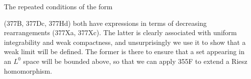 {The repeated conditions of the form



\noindent (377B, 377Dc, 377Hd) both have expressions in terms of
decreasing rearrangements (377Xa, 377Xc).   The latter is clearly
associated with uniform integrability and weak compactness, and
unsurprisingly we use it to show that a weak limit will be defined.
The former is there to ensure that a set appearing in an $L^0$ space will
be bounded above, so that we can apply 355F to extend a Riesz homomorphism.
}%

\discrpage

